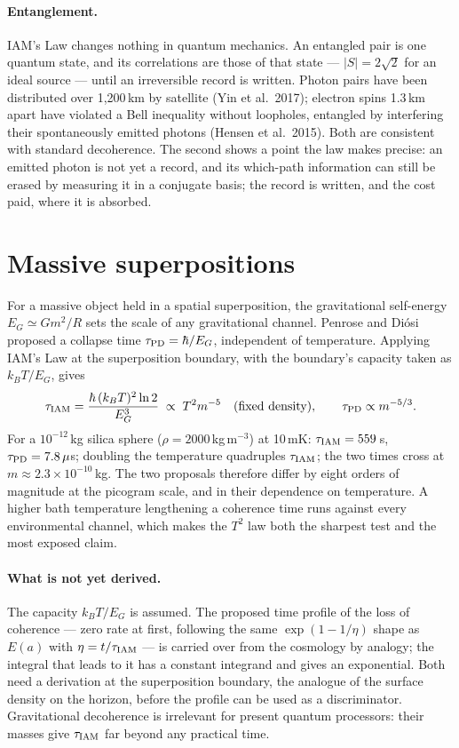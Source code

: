 \paragraph{Entanglement.} IAM's Law changes nothing in quantum mechanics. An entangled pair is one quantum state, and its correlations are those of that
state --- $|S|=2\sqrt2$ for an ideal source --- until an irreversible record is written. Photon pairs have been distributed over 1,200\,km by satellite
(Yin et al.\ 2017); electron spins 1.3\,km apart have violated a Bell inequality without loopholes, entangled by interfering their spontaneously emitted
photons (Hensen et al.\ 2015). Both are consistent with standard decoherence. The second shows a point the law makes precise: an emitted photon is not yet
a record, and its which-path information can still be erased by measuring it in a conjugate basis; the record is written, and the cost paid, where it is
absorbed.

\section{Massive superpositions}
For a massive object held in a spatial superposition, the gravitational self-energy $E_G\simeq Gm^2/R$ sets the scale of any gravitational channel.
Penrose and Di\'osi proposed a collapse time $\tau_{\rm PD}=\hbar/E_G$, independent of temperature. Applying IAM's Law at the superposition boundary,
with the boundary's capacity taken as $k_BT/E_G$, gives
\begin{equation}\tau_{\rm IAM}=\frac{\hbar\,(k_BT)^2\ln2}{E_G^3}\;\propto\;T^2m^{-5}\quad(\text{fixed density}),\qquad\tau_{\rm PD}\propto m^{-5/3}.\end{equation}
For a $10^{-12}$\,kg silica sphere ($\rho=2000$\,kg\,m$^{-3}$) at 10\,mK: $\tau_{\rm IAM}=559$\,s, $\tau_{\rm PD}=7.8\,\mu$s; doubling the temperature
quadruples $\tau_{\rm IAM}$; the two times cross at $m\approx2.3\times10^{-10}$\,kg. The two proposals therefore differ by eight orders of magnitude at the
picogram scale, and in their dependence on temperature. A higher bath temperature lengthening a coherence time runs against every environmental channel,
which makes the $T^2$ law both the sharpest test and the most exposed claim.

\paragraph{What is not yet derived.} The capacity $k_BT/E_G$ is assumed. The proposed time profile of the loss of coherence --- zero rate at first,
following the same $\exp(1-1/\eta)$ shape as $E(a)$ with $\eta=t/\tau_{\rm IAM}$ --- is carried over from the cosmology by analogy; the integral that
leads to it has a constant integrand and gives an exponential. Both need a derivation at the superposition boundary, the analogue of the surface density
on the horizon, before the profile can be used as a discriminator. Gravitational decoherence is irrelevant for present quantum processors: their
masses give $\tau_{\rm IAM}$ far beyond any practical time.

